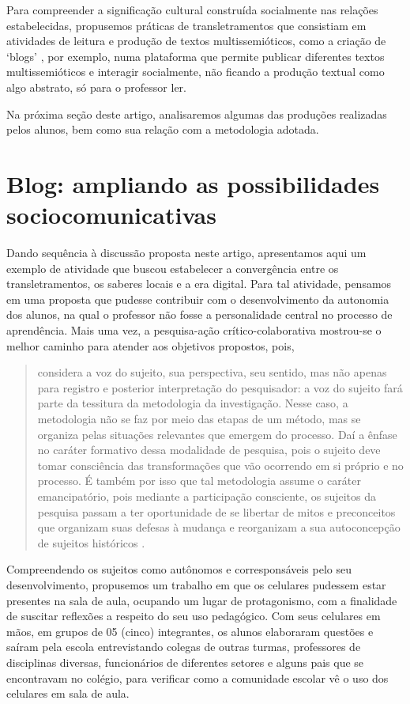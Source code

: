 \documentclass{textolivre}
\begin{document}
Para compreender a significação cultural construída socialmente nas relações estabelecidas, propusemos práticas de transletramentos que consistiam em atividades de leitura e produção de textos multissemióticos, como a criação de ‘blogs’ \cite{fernandez2012}, por exemplo, numa plataforma que permite publicar diferentes textos multissemióticos e interagir socialmente, não ficando a produção textual como algo abstrato, só para o professor ler. 

Na próxima seção deste artigo, analisaremos algumas das produções realizadas pelos alunos, bem como sua relação com a metodologia adotada.






\section{Blog: ampliando as possibilidades sociocomunicativas}\label{sec-blog}
Dando sequência à discussão proposta neste artigo, apresentamos aqui um exemplo de atividade que buscou estabelecer a convergência entre os transletramentos, os saberes locais e a era digital. Para tal atividade, pensamos em uma proposta que pudesse contribuir com o desenvolvimento da autonomia dos alunos, na qual o professor não fosse a personalidade central no processo de aprendência. Mais uma vez, a pesquisa-ação crítico-colaborativa mostrou-se o melhor caminho para atender aos objetivos propostos, pois,

\begin{quote}
considera a voz do sujeito, sua perspectiva, seu sentido, mas não apenas para registro e posterior interpretação do pesquisador: a voz do sujeito fará parte da tessitura da metodologia da investigação. Nesse caso, a metodologia não se faz por meio das etapas de um método, mas se organiza pelas situações relevantes que emergem do processo. Daí a ênfase no caráter formativo dessa modalidade de pesquisa, pois o sujeito deve tomar consciência das transformações que vão ocorrendo em si próprio e no processo. É também por isso que tal metodologia assume o caráter emancipatório, pois mediante a participação consciente, os sujeitos da pesquisa passam a ter oportunidade de se libertar de mitos e preconceitos que organizam suas defesas à mudança e reorganizam a sua autoconcepção de sujeitos históricos \cite[p. 486]{franco2005}.
\end{quote}

Compreendendo os sujeitos como autônomos e corresponsáveis pelo seu desenvolvimento, propusemos um trabalho em que os celulares pudessem estar presentes na sala de aula, ocupando um lugar de protagonismo, com a finalidade de suscitar reflexões a respeito do seu uso pedagógico. Com seus celulares em mãos, em grupos de 05 (cinco) integrantes, os alunos elaboraram questões e saíram pela escola entrevistando colegas de outras turmas, professores de disciplinas diversas, funcionários de diferentes setores e alguns pais que se encontravam no colégio, para verificar como a comunidade escolar vê o uso dos celulares em sala de aula.
\end{document}
